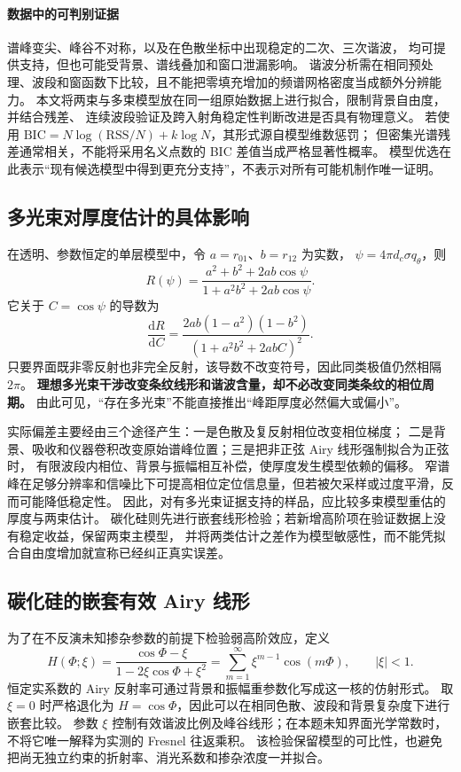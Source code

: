 \paragraph{数据中的可判别证据}
谱峰变尖、峰谷不对称，以及在色散坐标中出现稳定的二次、三次谐波，
均可提供支持，但也可能受背景、谱线叠加和窗口泄漏影响。
谐波分析需在相同预处理、波段和窗函数下比较，且不能把零填充增加的频谱网格密度当成额外分辨能力\cite{Harris1978}。
本文将两束与多束模型放在同一组原始数据上进行拟合，限制背景自由度，并结合残差、
连续波段验证及跨入射角稳定性判断改进是否具有物理意义。
若使用 $\mathrm{BIC}=N\log(\mathrm{RSS}/N)+k\log N$，其形式源自模型维数惩罚\cite{Schwarz1978}；
但密集光谱残差通常相关，不能将采用名义点数的 BIC 差值当成严格显著性概率。
模型优选在此表示“现有候选模型中得到更充分支持”，不表示对所有可能机制作唯一证明。

\subsection{多光束对厚度估计的具体影响}
在透明、参数恒定的单层模型中，令 $a=r_{01}$、$b=r_{12}$ 为实数，
$\psi=4\pi d_c\sigma q_\theta$，则
\begin{equation}
 R(\psi)=\frac{a^2+b^2+2ab\cos\psi}
 {1+a^2b^2+2ab\cos\psi}.
 \label{eq:airy-real}
\end{equation}
它关于 $C=\cos\psi$ 的导数为
\begin{equation}
 \frac{\mathrm{d}R}{\mathrm{d}C}
 =\frac{2ab(1-a^2)(1-b^2)}{(1+a^2b^2+2abC)^2}.
 \label{eq:airy-monotonic}
\end{equation}
只要界面既非零反射也非完全反射，该导数不改变符号，因此同类极值仍然相隔 $2\pi$。
\textbf{理想多光束干涉改变条纹线形和谐波含量，却不必改变同类条纹的相位周期。}
由此可见，“存在多光束”不能直接推出“峰距厚度必然偏大或偏小”。

实际偏差主要经由三个途径产生：一是色散及复反射相位改变相位梯度；
二是背景、吸收和仪器卷积改变原始谱峰位置；三是把非正弦 Airy 线形强制拟合为正弦时，
有限波段内相位、背景与振幅相互补偿，使厚度发生模型依赖的偏移。
窄谱峰在足够分辨率和信噪比下可提高相位定位信息量，但若被欠采样或过度平滑，反而可能降低稳定性。
因此，对有多光束证据支持的样品，应比较多束模型重估的厚度与两束估计。
碳化硅则先进行嵌套线形检验；若新增高阶项在验证数据上没有稳定收益，保留两束主模型，
并将两类估计之差作为模型敏感性，而不能凭拟合自由度增加就宣称已经纠正真实误差。

\subsection{碳化硅的嵌套有效 Airy 线形}
为了在不反演未知掺杂参数的前提下检验弱高阶效应，定义
\begin{equation}
 H(\Phi;\xi)=\frac{\cos\Phi-\xi}{1-2\xi\cos\Phi+\xi^2}
 =\sum_{m=1}^{\infty}\xi^{m-1}\cos(m\Phi),\qquad |\xi|<1.
 \label{eq:effective-airy-kernel}
\end{equation}
恒定实系数的 Airy 反射率可通过背景和振幅重参数化写成这一核的仿射形式。
取 $\xi=0$ 时严格退化为 $H=\cos\Phi$，因此可以在相同色散、波段和背景复杂度下进行嵌套比较。
参数 $\xi$ 控制有效谐波比例及峰谷线形；在本题未知界面光学常数时，
不将它唯一解释为实测的 Fresnel 往返乘积。
该检验保留模型的可比性，也避免把尚无独立约束的折射率、消光系数和掺杂浓度一并拟合。

